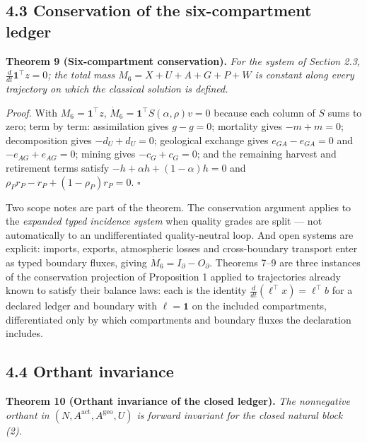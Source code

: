 \documentclass[11pt]{article}
\begin{document}
\subsection*{4.3 Conservation of the six-compartment ledger}\label{43-conservation-of-the-six-compartment-ledger}

\textbf{Theorem 9 (Six-compartment conservation).} \emph{For the system of Section 2.3, \(\frac{d}{dt}\mathbf{1}^\top z =\allowbreak{} 0\); the total mass \(M_6 = X + U + A + G + P + W\) is constant along every trajectory on which the classical solution is defined.}

\emph{Proof.} With \(M_6 = \mathbf{1}^\top z\), \(\dot M_6 =\allowbreak{} \mathbf{1}^\top S(\alpha,\allowbreak{}\rho) v =\allowbreak{} 0\) because each column of \(S\) sums to zero; term by term: assimilation gives \(g - g = 0\); mortality gives \(-m + m = 0\); decomposition gives \(-d_U + d_U = 0\); geological exchange gives \(e_{GA} - e_{GA} = 0\) and \(-e_{AG} + e_{AG} = 0\); mining gives \(-c_G + c_G = 0\); and the remaining harvest and retirement terms satisfy \(-h +\allowbreak{} \alpha h +\allowbreak{} (1-\alpha)h =\allowbreak{} 0\) and \(\rho_P r_P - r_P +\allowbreak{} (1-\rho_P)r_P =\allowbreak{} 0\). \(\square\)

Two scope notes are part of the theorem. The conservation argument applies to the \emph{expanded typed incidence system} when quality grades are split --- not automatically to an undifferentiated quality-neutral loop. And open systems are explicit: imports, exports, atmospheric losses and cross-boundary transport enter as typed boundary fluxes, giving \(\dot M_6=I_\partial-O_\partial\). Theorems 7--9 are three instances of the conservation projection of Proposition 1 applied to trajectories already known to satisfy their balance laws: each is the identity \(\frac{d}{dt}(\ell^\top x) = \ell^\top b\) for a declared ledger and boundary with \(\ell = \mathbf{1}\) on the included compartments, differentiated only by which compartments and boundary fluxes the declaration includes.

\subsection*{4.4 Orthant invariance}\label{44-orthant-invariance}

\textbf{Theorem 10 (Orthant invariance of the closed ledger).} \emph{The nonnegative orthant in \((N,\allowbreak{} A^{\mathrm{act}},\allowbreak{} A^{\mathrm{geo}},\allowbreak{} U)\) is forward invariant for the closed natural block (2).}
\end{document}
